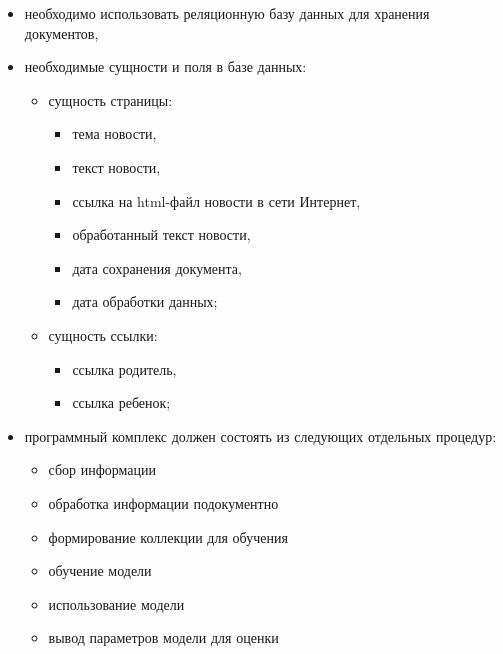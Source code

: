\begin{itemize}
    \item необходимо использовать реляционную базу данных для хранения документов,
    \item необходимые сущности и поля в базе данных:
    \begin{itemize}
        \item сущность страницы:
        \begin{itemize}
            \item тема новости,
            \item текст новости,
            \item ссылка на html-файл новости в сети Интернет,
            \item обработанный текст новости,
            \item дата сохранения документа,
            \item дата обработки данных;
        \end{itemize}
        \item сущность ссылки:
        \begin{itemize}
            \item ссылка родитель,
            \item ссылка ребенок;
        \end{itemize}
    \end{itemize}
    \item программный комплекс должен состоять из следующих отдельных процедур:
    \begin{itemize}
        \item сбор информации
        \item обработка информации подокументно
        \item формирование коллекции для обучения
        \item обучение модели
        \item использование модели
        \item вывод параметров модели для оценки
    \end{itemize}
\end{itemize}